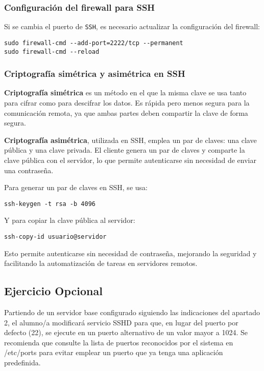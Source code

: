\subsubsection{Configuración del firewall para SSH}
Si se cambia el puerto de \texttt{SSH}, es necesario actualizar la configuración del firewall:

\begin{lstlisting}[style=mystyle]
sudo firewall-cmd --add-port=2222/tcp --permanent
sudo firewall-cmd --reload
\end{lstlisting}

\subsubsection{Criptografía simétrica y asimétrica en SSH}
\textbf{Criptografía simétrica} es un método en el que la misma clave se usa tanto para cifrar como para descifrar los datos. Es rápida pero menos segura para la comunicación remota, ya que ambas partes deben compartir la clave de forma segura.

\textbf{Criptografía asimétrica}, utilizada en SSH, emplea un par de claves: una clave pública y una clave privada. El cliente genera un par de claves y comparte la clave pública con el servidor, lo que permite autenticarse sin necesidad de enviar una contraseña.

Para generar un par de claves en SSH, se usa:

\begin{lstlisting}[style=mystyle]
ssh-keygen -t rsa -b 4096
\end{lstlisting}

Y para copiar la clave pública al servidor:

\begin{lstlisting}[style=mystyle]
ssh-copy-id usuario@servidor
\end{lstlisting}

Esto permite autenticarse sin necesidad de contraseña, mejorando la seguridad y facilitando la automatización de tareas en servidores remotos.

\subsection{Ejercicio Opcional}

Partiendo de un servidor base configurado siguiendo las indicaciones del apartado 2, el
alumno/a modificará servicio SSHD para que, en lugar del puerto por defecto (22), se ejecute en
un puerto alternativo de un valor mayor a 1024. Se recomienda que consulte la lista de puertos
reconocidos por el sistema en /etc/ports para evitar emplear un puerto que ya tenga una
aplicación predefinida.


